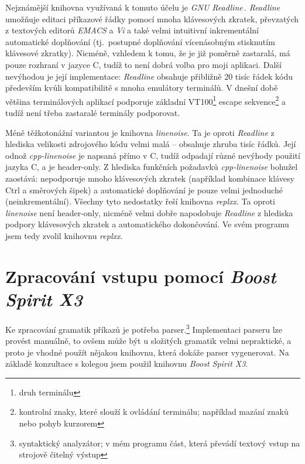 \documentclass[thesis=B,czech,hidelinks]{FITthesis}[2019/03/06]
\newcommand{\Rplus}{\protect\hspace{-.1em}\protect\raisebox{.35ex}{\smaller{\smaller\textbf{+}}}}
\newcommand{\Cpp}{\mbox{C\Rplus\Rplus}\xspace}
\begin{document}
Nejznámější knihovna využívaná k tomuto účelu je \textit{GNU Readline}\,\cite{readline}. \textit{Readline} umožňuje editaci příkazové řádky pomocí mnoha klávesových zkratek, převzatých z textových editorů \textit{EMACS} a \textit{Vi} a také velmi intuitivní inkrementální automatické doplňování (tj.\ postupné doplňování vícenásobným stisknutím klávesové zkratky). Nicméně, vzhledem k tomu, že je již poměrně zastaralá, má pouze rozhraní v jazyce C, tudíž to není dobrá volba pro moji aplikaci. Další nevýhodou je její implementace: \textit{Readline} obsahuje přibližně 20 tisíc řádek kódu především kvůli kompatibilitě s mnoha emulátory terminálů. V dnešní době většina terminálových aplikací podporuje základní VT100\footnote{druh terminálu} escape sekvence\footnote{kontrolní znaky, které slouží k ovládání terminálu; například mazání znaků nebo pohyb kurzorem} a tudíž není třeba zastaralé terminály podporovat.\cite{linenoise-readme}

Méně těžkotonážní variantou je knihovna \textit{linenoise}. Ta je oproti \textit{Readline} z hlediska velikosti zdrojového kódu velmi malá -- obsahuje zhruba tisíc řádků. Její odnož \textit{cpp-linenoise} je napsaná přímo v \Cpp{}, tudíž odpadají různé nevýhody použití jazyka C, a je header-only. Z hlediska funkčních požadavků \textit{cpp-linenoise} bohužel zaostává: nepodporuje mnoho klávesových zkratek (například kombinace klávesy Ctrl a směrových šipek) a automatické doplňování je pouze velmi jednoduché (neinkrementální). Všechny tyto nedostatky řeší knihovna \textit{replxx}. Ta oproti \textit{linenoise} není header-only, nicméně velmi dobře napodobuje \textit{Readline} z hlediska podpory klávesových zkratek a automatického dokončování. Ve svém programu jsem tedy zvolil knihovnu \textit{replxx}.

\section{Zpracování vstupu pomocí \textit{Boost Spirit X3}}\label{spirit:intro}
Ke zpracování gramatik příkazů je potřeba parser.\footnote{syntaktický analyzátor; v mém programu část, která převádí textový vstup na strojově čitelný výstup} Implementaci parseru lze provést manuálně, to ovšem může být u složitých gramatik velmi nepraktické, a proto je vhodné použít nějakou knihovnu, která dokáže parser vygenerovat. Na základě konzultace s kolegou jsem použil knihovnu \textit{Boost Spirit X3}.
\end{document}
